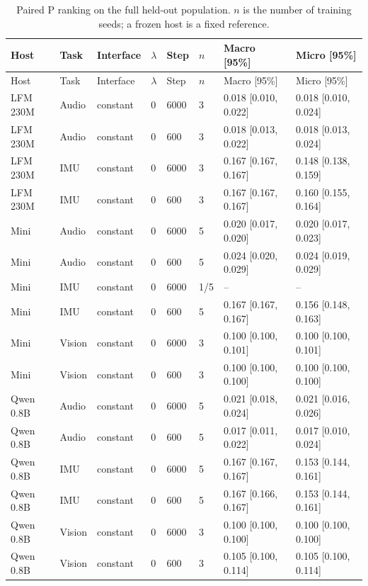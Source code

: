 {\small
\setlength{\tabcolsep}{4pt}
\begin{longtable}{@{}llllllll@{}}
\caption{Paired P ranking on the full held-out population. $n$ is the number of training seeds; a frozen host is a fixed reference.}\label{tab:full-ranking}\\
\toprule
Host & Task & Interface & $\lambda$ & Step & $n$ & Macro [95\%] & Micro [95\%] \\
\midrule\endfirsthead
\toprule
Host & Task & Interface & $\lambda$ & Step & $n$ & Macro [95\%] & Micro [95\%] \\
\midrule\endhead
LFM 230M & Audio & constant & 0 & 6000 & 3 & 0.018 [0.010, 0.022] & 0.018 [0.010, 0.024] \\
LFM 230M & Audio & constant & 0 & 600 & 3 & 0.018 [0.013, 0.022] & 0.018 [0.013, 0.024] \\
LFM 230M & IMU & constant & 0 & 6000 & 3 & 0.167 [0.167, 0.167] & 0.148 [0.138, 0.159] \\
LFM 230M & IMU & constant & 0 & 600 & 3 & 0.167 [0.167, 0.167] & 0.160 [0.155, 0.164] \\
Mini & Audio & constant & 0 & 6000 & 5 & 0.020 [0.017, 0.020] & 0.020 [0.017, 0.023] \\
Mini & Audio & constant & 0 & 600 & 5 & 0.024 [0.020, 0.029] & 0.024 [0.019, 0.029] \\
Mini & IMU & constant & 0 & 6000 & 1/5 & -- & -- \\
Mini & IMU & constant & 0 & 600 & 5 & 0.167 [0.167, 0.167] & 0.156 [0.148, 0.163] \\
Mini & Vision & constant & 0 & 6000 & 3 & 0.100 [0.100, 0.101] & 0.100 [0.100, 0.101] \\
Mini & Vision & constant & 0 & 600 & 3 & 0.100 [0.100, 0.100] & 0.100 [0.100, 0.100] \\
Qwen 0.8B & Audio & constant & 0 & 6000 & 5 & 0.021 [0.018, 0.024] & 0.021 [0.016, 0.026] \\
Qwen 0.8B & Audio & constant & 0 & 600 & 5 & 0.017 [0.011, 0.022] & 0.017 [0.010, 0.024] \\
Qwen 0.8B & IMU & constant & 0 & 6000 & 5 & 0.167 [0.167, 0.167] & 0.153 [0.144, 0.161] \\
Qwen 0.8B & IMU & constant & 0 & 600 & 5 & 0.167 [0.166, 0.167] & 0.153 [0.144, 0.161] \\
Qwen 0.8B & Vision & constant & 0 & 6000 & 3 & 0.100 [0.100, 0.100] & 0.100 [0.100, 0.100] \\
Qwen 0.8B & Vision & constant & 0 & 600 & 3 & 0.105 [0.100, 0.114] & 0.105 [0.100, 0.114] \\

\end{longtable}}
